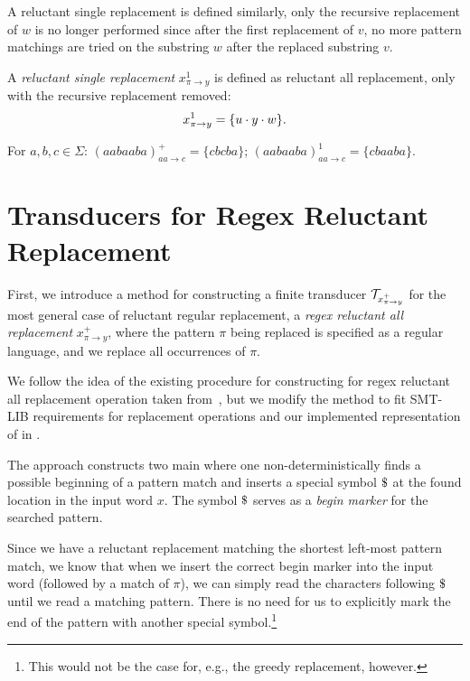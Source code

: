A reluctant single replacement is defined similarly, only the recursive replacement of $w$ is no longer performed since after the first replacement of $v$, no more pattern matchings are tried on the substring $w$ after the replaced substring $v$.
\begin{definition} \hfill \newline
  A \emph{reluctant single replacement} $x^{1}_{\pi \rightarrow y}$ is defined as reluctant all replacement, only with the recursive replacement removed:
  $$x^{1}_{\pi \rightarrow y} = \{ u \cdot y \cdot w \} \text{.}$$
\end{definition}

\begin{example}
  For $a, b, c \in \Sigma$: $(aabaaba)^{+}_{aa \rightarrow c} = \{ cbcba \}$; $(aabaaba)^{1}_{aa \rightarrow c} = \{ cbaaba \}$.
\end{example}

\section{Transducers for Regex Reluctant Replacement}

First, we introduce a method for constructing a finite transducer $\mathcal{T}_{x^{+}_{\pi \rightarrow y}}$ for the most general case of reluctant regular replacement, a \emph{regex reluctant all replacement} $x^{+}_{\pi \rightarrow y}$, where the pattern $\pi$ being replaced is specified as a regular language, and we replace all occurrences of $\pi$.

We follow the idea of the existing procedure for constructing \nft for regex reluctant all replacement operation taken from~\cite{replace_nfts_model_ModelingRegularReplacementForStringConstraintSolving_DBLP:conf/nfm/FuL10}, but we modify the method to fit SMT-LIB requirements for replacement operations and our implemented representation of \nfts in \mata.

The approach constructs two main \nfts where one non-deterministically finds a possible beginning of a pattern match and inserts a special symbol $\marker$ at the found location in the input word $x$. The symbol $\marker$ serves as a \emph{begin marker} for the searched pattern.

Since we have a reluctant replacement matching the shortest left-most pattern match, we know that when we insert the correct begin marker into the input word (followed by a match of $\pi$), we can simply read the characters following $\marker$ until we read a matching pattern. There is no need for us to explicitly mark the end of the pattern with another special symbol.\footnote{
  This would not be the case for, e.g., the greedy replacement, however.
}

